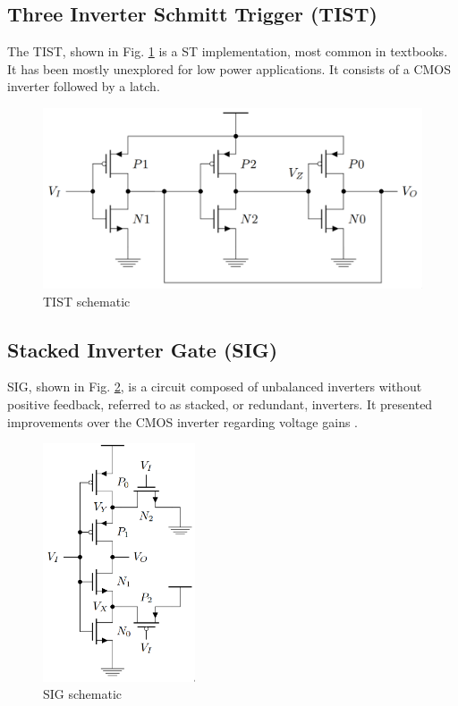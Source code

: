 \documentclass[pgmicro,mestrado,english]{iiufrgs}
\begin{document}
\subsection{Three Inverter Schmitt Trigger (TIST)}

The TIST, shown in Fig. \ref{fig:TIST} is a ST implementation, most common in textbooks. It has been mostly unexplored for low power applications. It consists of a CMOS inverter followed by a latch.

\begin{figure}[H]
  \centering
    \includegraphics[width=1\textwidth]{TIST.png}
     \caption{TIST schematic \cite{rabaey2002digital}}
  \label{fig:TIST}
\end{figure}

\subsection{Stacked Inverter Gate (SIG)}

SIG, shown in Fig. \ref{fig:SIG}, is a circuit composed of unbalanced inverters without positive feedback, referred to as stacked, or redundant, inverters. It presented improvements over the CMOS inverter regarding voltage gains \cite{bose2018stacked, luo2017sub}.  

\begin{figure}[H]
  \centering
    \includegraphics[width=0.4\textwidth]{SIG.png}
     \caption{SIG schematic \cite{bose2018stacked}}
  \label{fig:SIG}
\end{figure}
\end{document}

